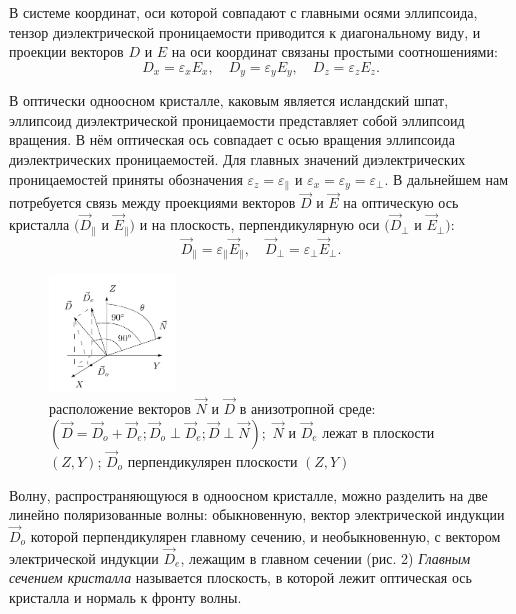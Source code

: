 \documentclass[a4paper, 12pt]{article}%
\begin{document}
	В системе координат, оси которой совпадают с главными осями эллипсоида, тензор диэлектрической проницаемости приводится к диагональному виду, и проекции векторов $D$ и $E$ на оси координат связаны простыми соотношениями:
	\begin{equation*}
		D_x = \varepsilon_x E_x, \quad D_y = \varepsilon_y E_y, \quad D_z = \varepsilon_z E_z.
	\end{equation*}
	
	В оптически одноосном кристалле, каковым является исландский шпат, эллипсоид диэлектрической проницаемости представляет собой эллипсоид вращения.
	В нём оптическая ось совпадает с осью вращения эллипсоида диэлектрических проницаемостей. Для главных значений диэлектрических проницаемостей приняты обозначения $\varepsilon_z = \varepsilon_\parallel$ и $\varepsilon_x = \varepsilon_y = \varepsilon_\perp$. В дальнейшем нам потребуется связь между проекциями векторов $\vec D$ и $\vec E$ на оптическую ось кристалла $(\vec D_\parallel $ и $\vec E_\parallel )$ и на плоскость, перпендикулярную оси $(\vec D_\perp $ и $\vec E_\perp )$:
	\begin{equation}
		\vec D_\parallel  = \varepsilon_\parallel \vec E_\parallel , \quad \vec D_\perp  = \varepsilon_\perp \vec E_\perp. 
	\end{equation} 

	\begin{figure}[H]
		\begin{center}
			\includegraphics[width=0.3\textwidth]{DN.png}
			\caption{расположение векторов $\vec N$ и $\vec D$ в анизотропной среде: $(\vec D = \vec D_o + \vec D_e; \vec D_o \perp \vec D_e; \vec D \perp \vec N);$ $\vec N$ и $\vec D_e$ лежат в плоскости $(Z, Y)$; $\vec D_o$ перпендикулярен плоскости $(Z, Y)$}
			\label{r}
		\end{center}
	\end{figure}
	Волну, распространяющуюся в одноосном кристалле, можно разделить на две линейно поляризованные волны: обыкновенную, вектор электрической индукции $\vec D_o$ которой перпендикулярен главному сечению, и необыкновенную, с вектором электрической индукции $\vec D_e$, лежащим в главном сечении (рис. 2) \textit{Главным сечением кристалла} называется плоскость, в которой лежит оптическая ось кристалла и нормаль к фронту волны.
	
\end{document}
